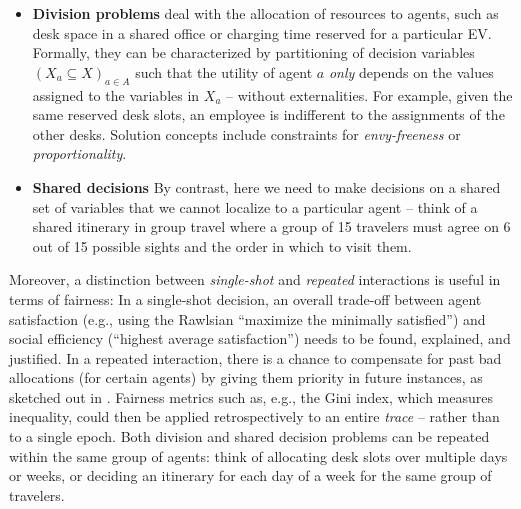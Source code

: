 \documentclass[german, a4paper, 11pt, oneside]{scrbook}
\begin{document}
\begin{itemize}
    \item \textbf{Division problems} deal with the allocation of resources to agents, such as desk space in a shared office or charging time reserved for a particular EV. Formally, they can be characterized by partitioning of decision variables $(X_a \subseteq X)_{a \in A}$ such that the utility of agent $a$ \emph{only} depends on the values assigned to the variables in $X_a$ -- without externalities. For example, given the same reserved desk slots, an employee is indifferent to the assignments of the other desks. Solution concepts include constraints for \emph{envy-freeness} or \emph{proportionality}.
    \item \textbf{Shared decisions} By contrast, here we need to make decisions on a shared set of variables that we cannot localize to a particular agent -- think of a shared itinerary in group travel where a group of 15 travelers must agree on 6 out of 15 possible sights and the order in which to visit them. 
\end{itemize}

Moreover, a distinction between \emph{single-shot} and \emph{repeated} interactions is useful in terms of fairness: In a single-shot decision, an overall trade-off between agent satisfaction (e.g., using the Rawlsian ``maximize the minimally satisfied'') and social efficiency (``highest average satisfaction'') needs to be found, explained, and justified. In a repeated interaction, there is a chance to compensate for past bad allocations (for certain agents) by giving them priority in future instances, as sketched out in \cite{.2022}. Fairness metrics such as, e.g., the Gini index, which measures inequality, could then be applied retrospectively to an entire \emph{trace} -- rather than to a single epoch. Both division and shared decision problems can be repeated within the same group of agents: think of allocating desk slots over multiple days or weeks, or deciding an itinerary for each day of a week for the same group of travelers.
\end{document}
